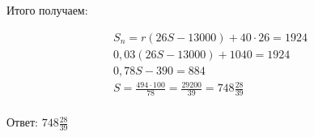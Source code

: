 \begin{tcolorbox}[
    colback=white!100!white,
    colframe=green!75!black,
    title=Решение 1.1
  ]
  Итого получаем:

  \begin{equation*}
    \begin{array}{l}
      S_n = r(26S - 13000) + 40\cdot 26 = 1924                           \\
      0,03 (26S - 13000) + 1040 = 1924                                   \\
      0,78S - 390 = 884                                                  \\
      S = \frac{494\cdot 100}{78} = \frac{29200}{39} = 748 \frac{28}{39} \\
    \end{array}
  \end{equation*}

  Ответ: $748 \frac{28}{39}$

\end{tcolorbox}

